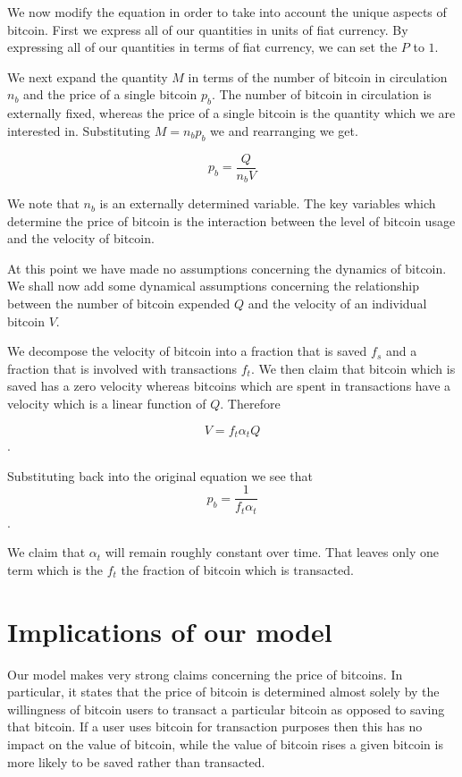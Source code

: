 We now modify the equation in order to take into account the unique
aspects of bitcoin.  First we express all of our quantities in units
of fiat currency.  By expressing all of our quantities in terms of
fiat currency, we can set the $P$ to $1$.

We next expand the quantity $M$ in terms of the number of bitcoin in
circulation $n_b$ and the price of a single bitcoin $p_b$.  The number
of bitcoin in circulation is externally fixed, whereas the price of a
single bitcoin is the quantity which we are interested in.
Substituting $M=n_b p_b$ we and rearranging we get.

\begin{equation}
p_b = \frac{Q}{n_b V}
\end{equation}

We note that $n_b$ is an externally determined variable.  The key
variables which determine the price of bitcoin is the interaction
between the level of bitcoin usage and the velocity of bitcoin.

At this point we have made no assumptions concerning the dynamics of
bitcoin.  We shall now add some dynamical assumptions concerning the
relationship between the number of bitcoin expended $Q$ and the
velocity of an individual bitcoin $V$.

We decompose the velocity of bitcoin into a fraction that is saved
$f_s$ and a fraction that is involved with transactions $f_t$.  We
then claim that bitcoin which is saved has a zero velocity whereas
bitcoins which are spent in transactions have a velocity which is a
linear function of $Q$.  Therefore

\begin{equation}
V = f_t\alpha_t Q
\end{equation}.

Substituting back into the original equation we see that
\begin{equation}
p_b = \frac{1}{f_t \alpha_t}
\end{equation}.

We claim that $\alpha_t$ will remain roughly constant over time.  That
leaves only one term which is the $f_t$ the fraction of bitcoin which
is transacted.

\section{Implications of our model}
Our model makes very strong claims concerning the price of bitcoins.
In particular, it states that the price of bitcoin is determined
almost solely by the willingness of bitcoin users to transact a
particular bitcoin as opposed to saving that bitcoin.  If a user uses
bitcoin for transaction purposes then this has no impact on the value
of bitcoin, while the value of bitcoin rises a given bitcoin is more
likely to be saved rather than transacted.

